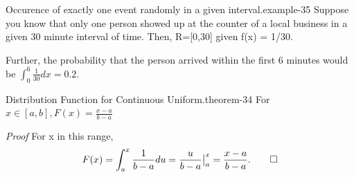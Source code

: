 \documentclass[10pt,]{book}
\makeatletter
\renewcommand*{\proofname}{Proof}
\renewenvironment{proof}[1][\proofname]{\par
  \pushQED{\qed}%
  \normalfont \topsep6\p@\@plus6\p@\relax
  \trivlist
  \item\relax
    {\itshape
    #1\@addpunct{.}}\hspace\labelsep\ignorespaces
}{%
  \popQED\endtrivlist\@endpefalse
}
\numberwithin{equation}{section}
\makeatother
\begin{document}
%
\par
\hypertarget{p-796}{}%
\begin{example}{Occurence of exactly one event randomly in a given interval.}{example-35}%
\hypertarget{p-797}{}%
Suppose you know that only one person showed up at the counter of a local business in a given 30 minute interval of time. Then, R=[0,30] given f(x) = 1/30.%
\par
\hypertarget{p-798}{}%
Further, the probability that the person arrived within the first 6 minutes would be \(\int_0^6 \frac{1}{30} dx = 0.2\).%
\end{example}
%
\par
\hypertarget{p-799}{}%
\begin{theorem}{Distribution Function for Continuous Uniform.}{}{theorem-34}%
\hypertarget{p-800}{}%
For \(x \in [a,b], F(x) = \frac{x-a}{b-a}\)%
\end{theorem}
\begin{proof}\hypertarget{proof-36}{}
\hypertarget{p-801}{}%
For x in this range,%
\begin{equation*}
F(x) = \int_a^x \frac{1}{b-a} du = \frac{u}{b-a} \big |_a^x = \frac{x-a}{b-a}.\qedhere
\end{equation*}
%
\end{proof}
%
%
%
\typeout{************************************************}
\typeout{************************************************}
%
\end{document}
